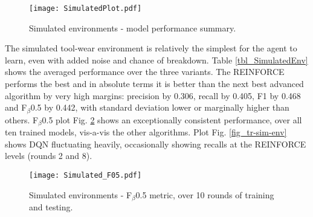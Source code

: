 \documentclass[referee, sn-mathphys-num]{sn-jnl}
\begin{document}
	\begin{figure}[hbt!]
		\centering
		\texttt{[image: SimulatedPlot.pdf]}  
		\caption{Simulated environments - model performance summary.}
		\label{fig_SimulatedEnv}
	\end{figure}
	The simulated tool-wear environment is relatively the simplest for the agent to learn, even with added noise and chance of breakdown. Table \ref{tbl_SimulatedEnv} shows the averaged performance over the three variants. The REINFORCE performs the best and in absolute terms it is better than the next best advanced algorithm by very high margins: precision by 0.306, recall by 0.405, F1 by 0.468 and F$_\beta$0.5 by 0.442, with standard deviation lower or marginally higher than others. F$_\beta$0.5 plot Fig. \ref{fig_FbetaSimulated} shows an exceptionally consistent performance, over all ten trained models, vis-a-vis the other algorithms. Plot Fig. \ref{fig_tr-sim-env} shows DQN fluctuating heavily, occasionally showing recalls at the REINFORCE levels (rounds 2 and 8).
	\begin{figure}[hbt!]
		\centering
		\texttt{[image: Simulated\_F05.pdf]}  
		\caption{Simulated environments - F$_\beta$0.5 metric, over 10 rounds of training and testing.}
		\label{fig_FbetaSimulated}
	\end{figure}
	
\end{document}
